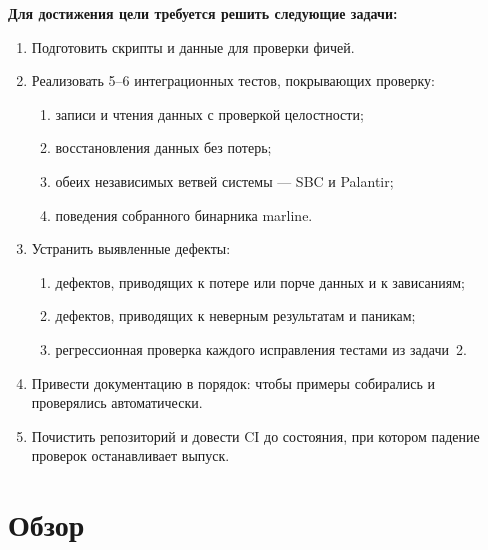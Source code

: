 \documentclass[a4paper]{article}
\begin{document}
\textbf{Для достижения цели требуется решить следующие задачи:}
\begin{enumerate}
    \item Подготовить скрипты и данные для проверки фичей.

    \item Реализовать 5--6 интеграционных тестов, покрывающих проверку:
    \begin{enumerate}
        \item записи и чтения данных с проверкой целостности;
        \item восстановления данных без потерь;
        \item обеих независимых ветвей системы --- SBC и Palantir;
        \item поведения собранного бинарника marline.
    \end{enumerate}

    \item Устранить выявленные дефекты:

    \begin{enumerate}
        \item дефектов, приводящих к потере или порче данных и к зависаниям;
        \item дефектов, приводящих к неверным результатам и паникам;
        \item регрессионная проверка каждого исправления тестами из задачи~2.
    \end{enumerate}

    \item Привести документацию в порядок: чтобы примеры собирались и проверялись автоматически.

    \item Почистить репозиторий и довести CI до состояния, при котором падение проверок останавливает выпуск.
\end{enumerate}

\section{Обзор}

\end{document}
